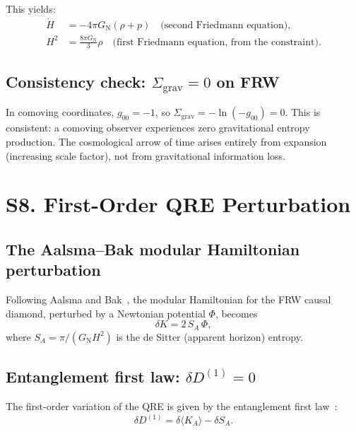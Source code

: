 \documentclass[aps,prd,preprint,superscriptaddress,longbibliography]{revtex4-2}
\newcommand{\KL}{D}
\newcommand{\GN}{G_{\mathrm{N}}}
\begin{document}
This yields:
\begin{align}
\dot{H} &= -4\pi\GN(\rho+p)
\quad\text{(second Friedmann equation)},
\label{eq:Friedmann2}\\
H^2 &= \frac{8\pi\GN}{3}\rho
\quad\text{(first Friedmann equation, from the constraint)}.
\label{eq:Friedmann1}
\end{align}

\subsection{Consistency check: $\Sigma_{\mathrm{grav}} = 0$ on FRW}

In comoving coordinates, $g_{00} = -1$, so
$\Sigma_{\mathrm{grav}} = -\ln(-g_{00}) = 0$.  This is consistent:
a comoving observer experiences zero gravitational entropy production.
The cosmological arrow of time arises entirely from expansion
(increasing scale factor), not from gravitational information loss.

\section{S8. First-Order QRE Perturbation}
\label{sec:first_order}

\subsection{The Aalsma--Bak modular Hamiltonian perturbation}

Following Aalsma and Bak~\cite{AalsmaBak2025}, the modular
Hamiltonian for the FRW causal diamond, perturbed by a Newtonian
potential $\Phi$, becomes
\begin{equation}
\delta K = 2\,S_A\,\Phi,
\label{eq:deltaK}
\end{equation}
where $S_A = \pi/(\GN H^2)$ is the de Sitter (apparent horizon) entropy.

\subsection{Entanglement first law: $\delta\KL^{(1)}=0$}

The first-order variation of the QRE is given by the entanglement
first law~\cite{Faulkner2014,BlancoCasini2013}:
\begin{equation}
\delta\KL^{(1)} = \delta\langle K_A\rangle - \delta S_A.
\label{eq:ent_first_law}
\end{equation}
\end{document}
